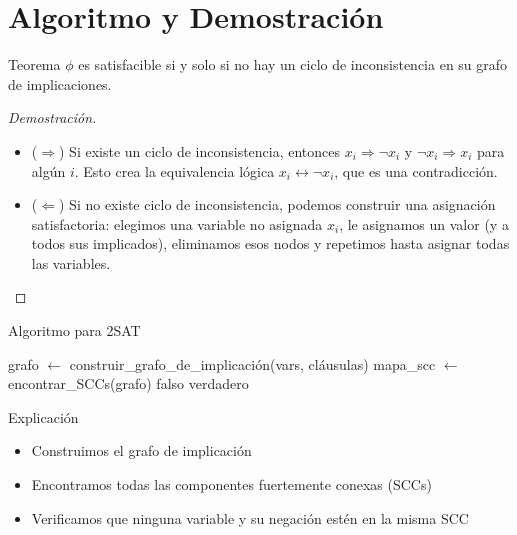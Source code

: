 \documentclass{beamer}
\begin{document}
\section{Algoritmo y Demostración}
\begin{frame}{}
\begin{block}{Teorema}
$\phi$ es satisfacible si y solo si no hay un ciclo de inconsistencia en su grafo de implicaciones.
\end{block}

\begin{proof}[Demostración]
\begin{itemize}
\item \alert{($\Rightarrow$)} Si existe un ciclo de inconsistencia, entonces $x_i \Rightarrow \neg x_i$ y $\neg x_i \Rightarrow x_i$ para algún $i$. Esto crea la equivalencia lógica $x_i \leftrightarrow \neg x_i$, que es una contradicción.

\item \alert{($\Leftarrow$)} Si no existe ciclo de inconsistencia, podemos construir una asignación satisfactoria: elegimos una variable no asignada $x_i$, le asignamos un valor (y a todos sus implicados), eliminamos esos nodos y repetimos hasta asignar todas las variables.
\end{itemize}
\end{proof}
\end{frame}

\begin{frame}{Algoritmo para 2SAT}
\begin{algorithm}[H]
\caption{2SAT (vars, cláusulas)}
\begin{algorithmic}[1]
\State grafo $\gets$ construir\_grafo\_de\_implicación(vars, cláusulas)
\State mapa\_scc $\gets$ encontrar\_SCCs(grafo)
        \State \Return falso
    \EndIf
\EndFor
\State \Return verdadero
\end{algorithmic}
\end{algorithm}

\begin{block}{Explicación}
\begin{itemize}
\item Construimos el grafo de implicación
\item Encontramos todas las componentes fuertemente conexas (SCCs)
\item Verificamos que ninguna variable y su negación estén en la misma SCC
\end{itemize}
\end{block}
\end{frame}
\end{document}

